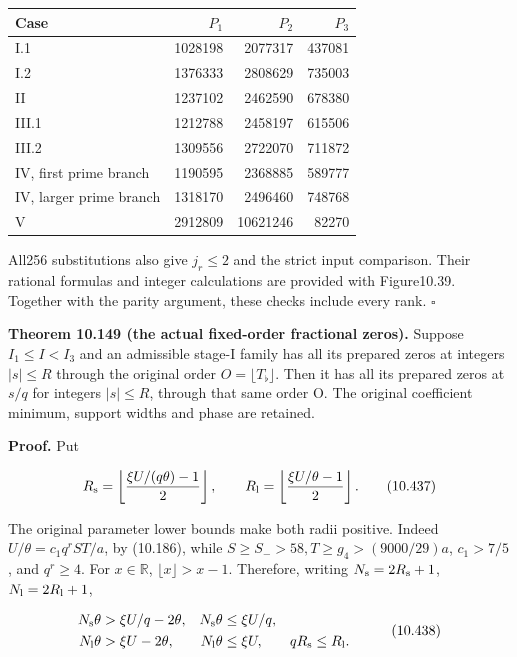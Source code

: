 \documentclass[
  11pt,
  a4paper,
]{article}
\newcounter{none} %
\begin{document}
{\def\LTcaptype{none} %
\begin{longtable}[]{@{}lrrr@{}}
\toprule\noalign{}
Case & \(P_1\) & \(P_2\) & \(P_3\) \\
\midrule\noalign{}
\endhead
\bottomrule\noalign{}
\endlastfoot
I.1 & 1028198 & 2077317 & 437081 \\
I.2 & 1376333 & 2808629 & 735003 \\
II & 1237102 & 2462590 & 678380 \\
III.1 & 1212788 & 2458197 & 615506 \\
III.2 & 1309556 & 2722070 & 711872 \\
IV, first prime branch & 1190595 & 2368885 & 589777 \\
IV, larger prime branch & 1318170 & 2496460 & 748768 \\
V & 2912809 & 10621246 & 82270 \\
\end{longtable}
}

All256 substitutions also give \(j_r\le2\) and the strict input
comparison. Their rational formulas and integer calculations are
provided with Figure10.39. Together with the parity argument, these
checks include every rank. \(\square\)

\textbf{Theorem 10.149 (the actual fixed-order fractional zeros).}
Suppose \(I_1\le I<I_3\) and an admissible stage-I family has all its
prepared zeros at integers \(|s|\le R\) through the original order
\(O=\lfloor T_\flat\rfloor\). Then it has all its prepared zeros at
\(s/q\) for integers \(|s|\le R\), through that same order O. The
original coefficient minimum, support widths and phase are retained.

\textbf{Proof.} Put

\[
R_{\rm s}=\left\lfloor\frac{\xi U/(q\theta)-1}{2}\right\rfloor,
\qquad
R_{\rm l}=\left\lfloor\frac{\xi U/\theta-1}{2}\right\rfloor.
\tag{10.437}
\]

The original parameter lower bounds make both radii positive. Indeed
\(U/\theta=c_1q^rST/a\), by (10.186), while
\(S\ge S_->58,T\ge g_4>(9000/29)a\), \(c_1>7/5\), and \(q^r\ge4\). For
\(x\in\mathbb R\), \(\lfloor x\rfloor>x-1\). Therefore, writing
\(N_{\rm s}=2R_{\rm s}+1\), \(N_{\rm l}=2R_{\rm l}+1\),

\[
\begin{aligned}
N_{\rm s}\theta&>\xi U/q-2\theta,&
N_{\rm s}\theta&\le\xi U/q,\\
N_{\rm l}\theta&>\xi U-2\theta,&
N_{\rm l}\theta&\le\xi U,&
qR_{\rm s}&\le R_{\rm l}.
\end{aligned}
\tag{10.438}
\]
\end{document}

